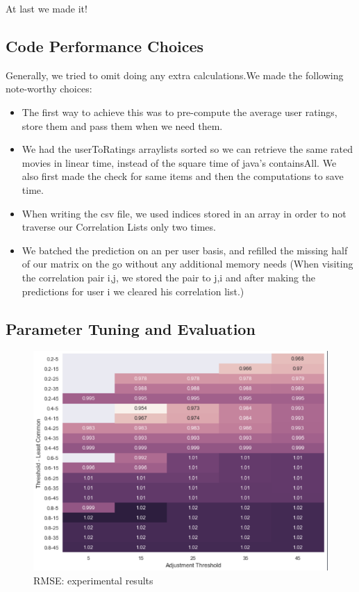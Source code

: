 \documentclass[12pt]{article}
\begin{document}
At last we made it!

\subsection{Code Performance Choices}

Generally, we tried to omit doing any extra calculations.We made the following note-worthy choices:

\begin{itemize}
    \item The first way to achieve this was to pre-compute the average user ratings, store them and pass them when we need them. 

    \item We had the userToRatings arraylists sorted so we can retrieve the same rated movies in linear time, instead of the square time of java's containsAll. We also first made the check for same items and then the computations to save time.

    \item When writing the csv file, we used indices stored in an array in order to not traverse our Correlation Lists only two times.

    \item We batched the prediction on an per user basis, and refilled the missing half of our matrix on the go without any additional memory needs (When visiting the correlation pair i,j, we stored the pair to j,i and after making the predictions for user i we cleared his correlation list.)

\end{itemize}

\subsection{Parameter Tuning and Evaluation}

\begin{figure}[h]
    \centering
    \includegraphics[width=1\textwidth]{../rmse}
    \caption{RMSE: experimental results}
    \label{fig:RMSE}
\end{figure}
 
\end{document}
